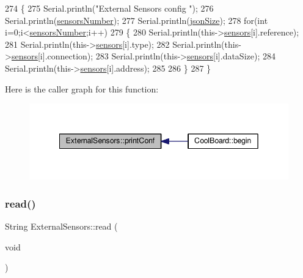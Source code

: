 \begin{DoxyCode}
274 \{
275     Serial.println(\textcolor{stringliteral}{"External Sensors config "});
276     Serial.println(\hyperlink{classExternalSensors_a58e4fbf9adeae787d92be5fa33043b5d}{sensorsNumber});
277     Serial.println(\hyperlink{classExternalSensors_acacea86d74d967b57fcff282d26cff57}{jsonSize});
278     \textcolor{keywordflow}{for}(\textcolor{keywordtype}{int} i=0;i<\hyperlink{classExternalSensors_a58e4fbf9adeae787d92be5fa33043b5d}{sensorsNumber};i++)
279     \{
280         Serial.println(this->\hyperlink{classExternalSensors_a284233f884fcf00154a44740cf1d9e1e}{sensors}[i].reference);
281         Serial.println(this->\hyperlink{classExternalSensors_a284233f884fcf00154a44740cf1d9e1e}{sensors}[i].type);
282         Serial.println(this->\hyperlink{classExternalSensors_a284233f884fcf00154a44740cf1d9e1e}{sensors}[i].connection);
283         Serial.println(this->\hyperlink{classExternalSensors_a284233f884fcf00154a44740cf1d9e1e}{sensors}[i].dataSize);
284         Serial.println(this->\hyperlink{classExternalSensors_a284233f884fcf00154a44740cf1d9e1e}{sensors}[i].address);
285     
286     \}
287 \}
\end{DoxyCode}
Here is the caller graph for this function\+:\nopagebreak
\begin{figure}[H]
\begin{center}
\leavevmode
\includegraphics[width=342pt]{classExternalSensors_a78c2bf55084435dd51d3c559b2d3c6f3_icgraph}
\end{center}
\end{figure}
\mbox{\label{classExternalSensors_a53177b81eca3be89508b5511ddcd00fc}} 
\subsubsection{\texorpdfstring{read()}{read()}}
{\footnotesize\ttfamily String External\+Sensors\+::read (\begin{DoxyParamCaption}\item[{void}]{ }\end{DoxyParamCaption})}

